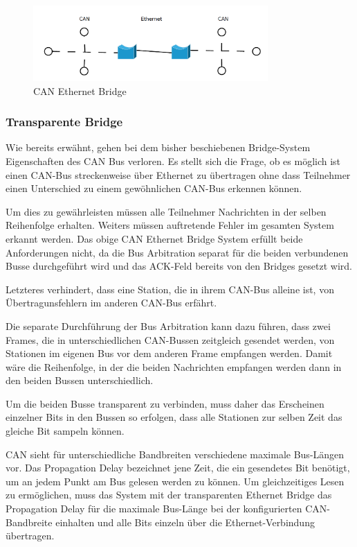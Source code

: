 \begin{figure}[h] 
\centering
\includegraphics[width=0.8\textwidth]{figures/can_bridge}
\caption{CAN Ethernet Bridge} 
\label{bridge}
\end{figure}

\subsubsection{Transparente Bridge}

Wie bereits erwähnt, gehen bei dem bisher beschiebenen Bridge-System Eigenschaften
des CAN Bus verloren. Es stellt sich die Frage, ob es möglich ist einen CAN-Bus
streckenweise über Ethernet zu übertragen ohne dass Teilnehmer einen Unterschied zu
einem gewöhnlichen CAN-Bus erkennen können.

Um dies zu gewährleisten müssen alle Teilnehmer Nachrichten in der selben Reihenfolge
erhalten. Weiters müssen auftretende Fehler im gesamten System erkannt werden. Das
obige CAN Ethernet Bridge System erfüllt beide Anforderungen nicht, da die Bus
Arbitration separat für die beiden verbundenen Busse durchgeführt wird und das
ACK-Feld bereits von den Bridges gesetzt wird.

Letzteres verhindert, dass eine Station, die in ihrem CAN-Bus alleine ist, von
Übertragunsfehlern im anderen CAN-Bus erfährt.

Die separate Durchführung der Bus Arbitration kann dazu führen, dass zwei Frames, die
in unterschiedlichen CAN-Bussen zeitgleich gesendet werden, von Stationen im eigenen
Bus vor dem anderen Frame empfangen werden. Damit wäre die Reihenfolge, in der die
beiden Nachrichten empfangen werden dann in den beiden Bussen unterschiedlich.

Um die beiden Busse transparent zu verbinden, muss daher das Erscheinen einzelner
Bits in den Bussen so erfolgen, dass alle Stationen zur selben Zeit das gleiche Bit
sampeln können.

CAN sieht für unterschiedliche Bandbreiten verschiedene maximale Bus-Längen vor. Das
Propagation Delay bezeichnet jene Zeit, die ein gesendetes Bit benötigt, um an jedem
Punkt am Bus gelesen werden zu können. Um gleichzeitiges Lesen zu ermöglichen, muss
das System mit der transparenten Ethernet Bridge das Propagation Delay für die
maximale Bus-Länge bei der konfigurierten CAN-Bandbreite einhalten und alle Bits
einzeln über die Ethernet-Verbindung übertragen.

